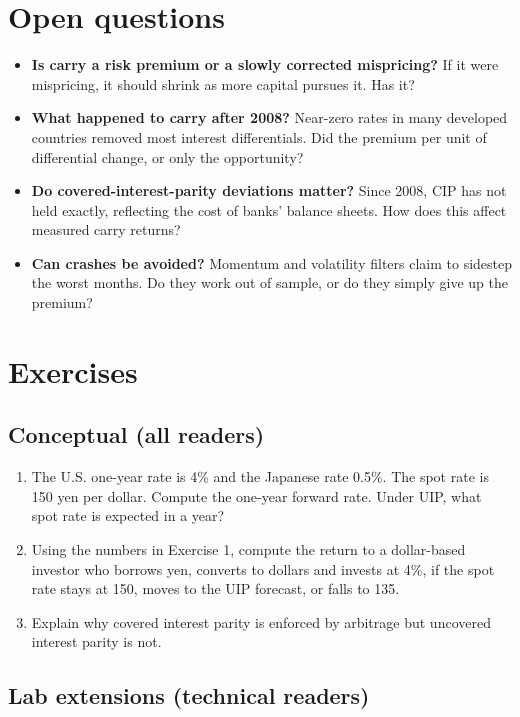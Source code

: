 \section{Open questions}
\label{sec:11-open}

\begin{itemize}
  \item \textbf{Is carry a risk premium or a slowly corrected mispricing?} If it were mispricing, it should shrink as more capital pursues it. Has it?
  \item \textbf{What happened to carry after 2008?} Near-zero rates in many developed countries removed most interest differentials. Did the premium per unit of differential change, or only the opportunity?
  \item \textbf{Do covered-interest-parity deviations matter?} Since 2008, CIP has not held exactly, reflecting the cost of banks' balance sheets. How does this affect measured carry returns?
  \item \textbf{Can crashes be avoided?} Momentum and volatility filters claim to sidestep the worst months. Do they work out of sample, or do they simply give up the premium?
\end{itemize}

\section*{Exercises}

\subsection*{Conceptual (all readers)}

\begin{enumerate}
  \item The U.S. one-year rate is 4\% and the Japanese rate 0.5\%. The spot rate is 150 yen per dollar. Compute the one-year forward rate. Under UIP, what spot rate is expected in a year?
  \item Using the numbers in Exercise 1, compute the return to a dollar-based investor who borrows yen, converts to dollars and invests at 4\%, if the spot rate stays at 150, moves to the UIP forecast, or falls to 135.
  \item Explain why covered interest parity is enforced by arbitrage but uncovered interest parity is not.
\end{enumerate}

\subsection*{Lab extensions (technical readers)}

